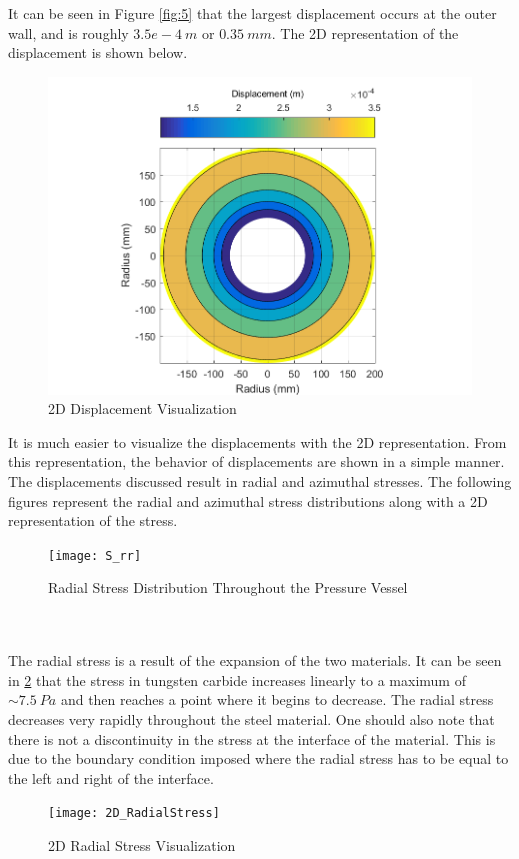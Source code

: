 \documentclass[times]{nmeauth}
\begin{document}
It can be seen in Figure \ref{fig:5} that the largest displacement occurs at the outer wall, and is roughly $3.5e-4~m$ or $0.35~mm$. The 2D representation of the displacement is shown below.
\begin{figure}[!htbp]
\centering \includegraphics[width=125mm]{2D_Displacement}
\caption{2D Displacement Visualization}\label{fig:6}
\end{figure}
It is much easier to visualize the displacements with the 2D representation. From this representation, the behavior of displacements are shown in a simple manner. The displacements discussed result in radial and azimuthal stresses. The following figures represent the radial and azimuthal stress distributions along with a 2D representation of the stress. 
\begin{figure}[!htbp]
\centering \texttt{[image: S\_rr]}
\caption{Radial Stress Distribution Throughout the Pressure Vessel}\label{fig:7}
\end{figure}\\\\
The radial stress is a result of the expansion of the two materials. It can be seen in \ref{fig:7} that the stress in tungsten carbide increases linearly to a maximum of $\sim 7.5~Pa$ and then reaches a point where it begins to decrease. The radial stress decreases very rapidly throughout the steel material. One should also note that there is not a discontinuity in the stress at the interface of the material. This is due to the boundary condition imposed where the radial stress has to be equal to the left and right of the interface. 
\begin{figure}[!htbp]
\centering \texttt{[image: 2D\_RadialStress]}
\caption{2D Radial Stress Visualization}\label{fig:8}
\end{figure}\\
\end{document}
